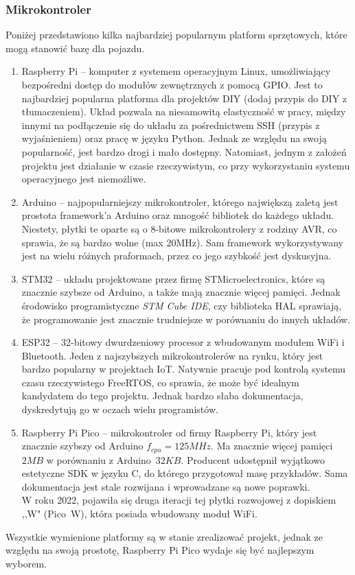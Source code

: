         \subsubsection{Mikrokontroler}
            Poniżej przedstawiono kilka najbardziej popularnym platform sprzętowych, które mogą stanowić bazę dla pojazdu.
            \begin{enumerate}
                \item Raspberry Pi -- komputer z systemem operacyjnym Linux, umożliwiający bezpośredni dostęp do modułów zewnętrznych z pomocą GPIO.
                Jest to najbardziej popularna platforma dla projektów DIY (dodaj przypis do DIY z tłumaczeniem). Układ pozwala na niesamowitą elastyczność w pracy, między innymi na podłączenie się do układu za pośrednictwem SSH (przypis z wyjaśnieniem) oraz pracę w języku Python.
                Jednak ze względu na swoją popularność, jest bardzo drogi i mało dostępny.
                Natomiast, jednym z założeń projektu jest działanie w czasie rzeczywistym, co przy wykorzystaniu systemu operacyjnego jest niemożliwe.
                \item Arduino -- najpopularniejszy mikrokontroler, którego największą zaletą jest prostota framework'a Arduino oraz mnogość bibliotek do każdego układu.
                Niestety, płytki te oparte są o 8-bitowe mikrokontrolery z rodziny AVR, co sprawia, że są bardzo wolne (max 20MHz).
                Sam framework wykorzystywany jest na wielu różnych praformach, przez co jego szybkość jest dyskusyjna.
                \item STM32 -- układu projektowane przez firmę STMicroelectronics, które są znacznie szybsze od Arduino, a także mają znacznie więcej pamięci.
                Jednak środowisko programistyczne \textit{STM Cube IDE}, czy biblioteka HAL sprawiają, że programowanie jest znacznie trudniejsze w porównaniu do innych układów.
                \item ESP32 -- 32-bitowy dwurdzeniowy procesor z wbudowanym modułem WiFi i Bluetooth.
                Jeden z najszybszych mikrokontrolerów na rynku, który jest bardzo popularny w projektach IoT.
                Natywnie pracuje pod kontrolą systemu czasu rzeczywistego FreeRTOS, co sprawia, że może być idealnym kandydatem do tego projektu.
                Jednak bardzo słaba dokumentacja, dyskredytują go w oczach wielu programistów.
                \item Raspberry Pi Pico -- mikrokontroler od firmy Raspberry Pi, który jest znacznie szybszy od Arduino $f_{cpu} = 125MHz$.
                Ma znacznie więcej pamięci $2MB$ w porównaniu z Arduino~$32KB$.
                Producent udostępnił wyjątkowo estetyczne SDK w języku C, do którego przygotował masę przykładów.
                Sama dokumentacja jest stale rozwijana i wprowadzane są nowe poprawki.\\
                W roku 2022, pojawiła się druga iteracji tej płytki rozwojowej z dopiskiem ,,W" (Pico~W), która posiada wbudowany moduł WiFi.
            \end{enumerate}
            Wszystkie wymienione platformy są w stanie zrealizować projekt, jednak ze względu na swoją prostotę, Raspberry Pi Pico wydaje się być najlepszym wyborem.

